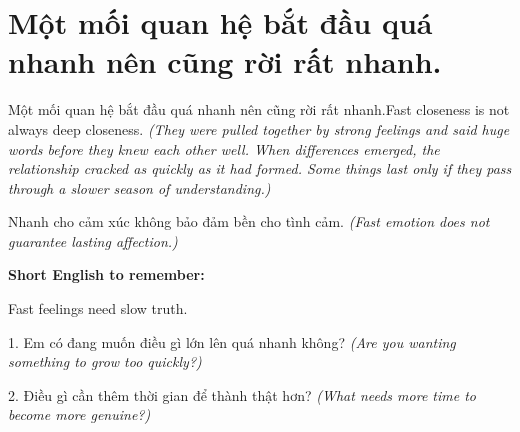 \section{Một mối quan hệ bắt đầu quá nhanh nên cũng rời rất nhanh.}
\begin{truyen}{Một mối quan hệ bắt đầu quá nhanh nên cũng rời rất nhanh.}{Fast closeness is not always deep closeness.}
\textit{(They were pulled together by strong feelings and said huge words before they knew each other well. When differences emerged, the relationship cracked as quickly as it had formed. Some things last only if they pass through a slower season of understanding.)}
\end{truyen}
\begin{baihoc}
Nhanh cho cảm xúc không bảo đảm bền cho tình cảm.
\textit{(Fast emotion does not guarantee lasting affection.)}
\end{baihoc}
\begin{ghinhoanh}
\textbf{Short English to remember:}

Fast feelings need slow truth.
\end{ghinhoanh}
\begin{tuhocnhanh}
1. Em có đang muốn điều gì lớn lên quá nhanh không? \textit{(Are you wanting something to grow too quickly?)}

2. Điều gì cần thêm thời gian để thành thật hơn? \textit{(What needs more time to become more genuine?)}
\end{tuhocnhanh}
\ngancach

